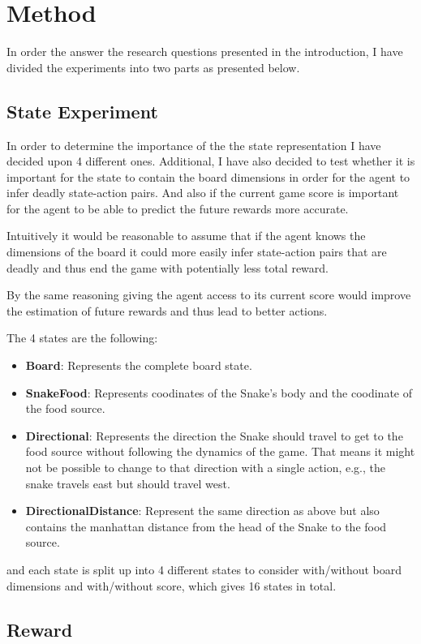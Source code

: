 \documentclass[report.tex]{subfiles}
\begin{document}
    \section*{\centering Method}

    In order the answer the research questions presented in the introduction, I have divided the experiments into two parts as presented below.

    \subsection*{State Experiment}

    In order to determine the importance of the the state representation I have decided upon 4 different ones. Additional, I have also decided to test whether it is important for the state to contain the board dimensions in order for the agent to infer deadly state-action pairs. And also if the current game score is important for the agent to be able to predict the future rewards more accurate.

    Intuitively it would be reasonable to assume that if the agent knows the dimensions of the board it could more easily infer state-action pairs that are deadly and thus end the game with potentially less total reward.

    By the same reasoning giving the agent access to its current score would improve the estimation of future rewards and thus lead to better actions.

    The 4 states are the following:

    \begin{itemize}
        \item \textbf{Board}: Represents the complete board state.
        \item \textbf{SnakeFood}: Represents coodinates of the Snake's body and the coodinate of the food source.
        \item \textbf{Directional}: Represents the direction the Snake should travel to get to the food source without following the dynamics of the game. That means it might not be possible to change to that direction with a single action, e.g., the snake travels east but should travel west.
        \item \textbf{DirectionalDistance}: Represent the same direction as above but also contains the manhattan distance from the head of the Snake to the food source.
    \end{itemize}

    and each state is split up into 4 different states to consider with/without board dimensions and with/without score, which gives 16 states in total.

    \subsection*{Reward}
\end{document}

